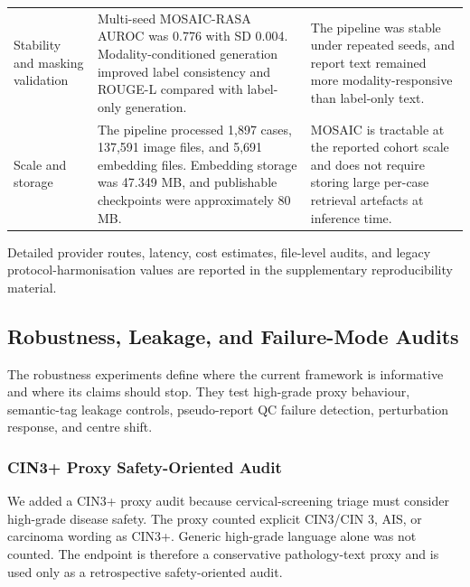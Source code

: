 \documentclass[11pt, a4paper]{article}
\theoremstyle{plain}
\theoremstyle{definition}
\begin{document}
\begin{table}[!htbp]
\begin{threeparttable}
{\begin{tabular}{p{3.4cm}p{5.6cm}p{7.0cm}}
    Stability and masking validation & Multi-seed MOSAIC-RASA AUROC was 0.776 with SD 0.004. Modality-conditioned generation improved label consistency and ROUGE-L compared with label-only generation. & The pipeline was stable under repeated seeds, and report text remained more modality-responsive than label-only text. \\
    Scale and storage & The pipeline processed 1,897 cases, 137,591 image files, and 5,691 embedding files. Embedding storage was 47.349 MB, and publishable checkpoints were approximately 80 MB. & MOSAIC is tractable at the reported cohort scale and does not require storing large per-case retrieval artefacts at inference time. \\
    \bottomrule
  \end{tabular}%
  }
  \begin{tablenotes}[flushleft]
    \footnotesize
    \item Detailed provider routes, latency, cost estimates, file-level audits, and legacy protocol-harmonisation values are reported in the supplementary reproducibility material.
  \end{tablenotes}
  \end{threeparttable}
\end{table}

\FloatBarrier

\subsection{Robustness, Leakage, and Failure-Mode Audits}
\label{subsec:robustness_stress_results}

The robustness experiments define where the current framework is informative and where its claims should stop. They test high-grade proxy behaviour, semantic-tag leakage controls, pseudo-report QC failure detection, perturbation response, and centre shift.

\subsubsection{CIN3+ Proxy Safety-Oriented Audit}
\label{subsec:cin3_proxy_safety_results}

We added a CIN3+ proxy audit because cervical-screening triage must consider high-grade disease safety. The proxy counted explicit CIN3/CIN 3, AIS, or carcinoma wording as CIN3+. Generic high-grade language alone was not counted. The endpoint is therefore a conservative pathology-text proxy and is used only as a retrospective safety-oriented audit.
\end{document}
